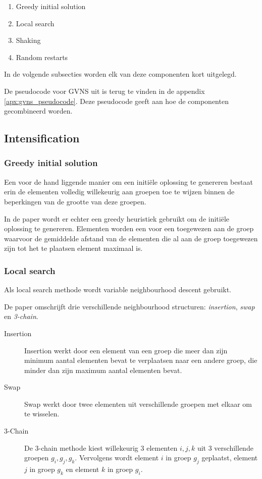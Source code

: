 \documentclass[pdftex,12pt,a4paper]{article}
\begin{document}
\begin{enumerate}
\item Greedy initial solution
\item Local search
\item Shaking
\item Random restarts
\end{enumerate}

In de volgende subsecties worden elk van deze componenten kort uitgelegd.

De pseudocode voor GVNS uit \cite{Urosevic} is terug te vinden in de appendix \ref{apx:gvns_pseudocode}. Deze pseudocode geeft aan hoe de componenten gecombineerd worden.

\subsection{Intensification}
\subsubsection{Greedy initial solution}
Een voor de hand liggende manier om een initi\"ele oplossing te genereren bestaat erin de elementen volledig willekeurig aan groepen toe te wijzen binnen de beperkingen van de grootte van deze groepen.

In de paper wordt er echter een greedy heuristiek gebruikt om de initi\"ele oplossing te genereren.
Elementen worden een voor een toegewezen aan de groep waarvoor de gemiddelde afstand van de elementen die al aan de groep toegewezen zijn tot het te plaatsen element maximaal is.

\subsubsection{Local search}
Als local search methode wordt variable neighbourhood descent gebruikt.

De paper omschrijft drie verschillende neighbourhood structuren: \emph{insertion}, \emph{swap} en \emph{3-chain}.

\begin{description}
\item[Insertion] Insertion werkt door een element van een groep die meer dan zijn minimum aantal elementen bevat te verplaatsen naar een andere groep, die minder dan zijn maximum aantal elementen bevat.
\item[Swap] Swap werkt door twee elementen uit verschillende groepen met elkaar om te wisselen.
\item[3-Chain] De 3-chain methode kiest willekeurig 3 elementen $i, j, k$ uit 3 verschillende groepen $g_{i}, g_{j}, g_{k}$. Vervolgens wordt element $i$ in groep $g_{j}$ geplaatst, element $j$ in groep $g_{k}$ en element $k$ in groep $g_{i}$.
\end{description}
\end{document}
